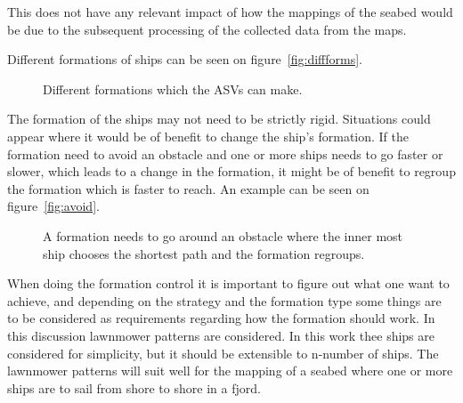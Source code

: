 
This does not have any relevant impact of how the mappings of the seabed would be due to the subsequent processing of the collected data from the maps.

Different formations of ships can be seen on figure~\vref{fig:diffforms}.
\begin{figure}[htbp]
	\centering
	
	\caption{Different formations which the \ac{ASV}s can make.}
	\label{fig:diffforms}
\end{figure}

The formation of the ships may not need to be strictly rigid. Situations could appear where it would be of benefit to change the ship's formation. If the formation need to avoid an obstacle and one or more ships needs to go faster or slower, which leads to a change in the formation, it might be of benefit to regroup the formation which is faster to reach. An example can be seen on figure~\vref{fig:avoid}.

\begin{figure}[htbp]
	\centering
	
	\caption{A formation needs to go around an obstacle where the inner most ship chooses the shortest path and the formation regroups.}
	\label{fig:avoid}
\end{figure}

When doing the formation control it is important to figure out what one
want to achieve, and depending on the strategy and the formation type
some things are to be considered as requirements regarding how the
formation should work. In this discussion lawnmower patterns are considered. In this work thee ships are considered for simplicity, but it should be extensible to n-number of ships. The lawnmower patterns will suit well for the mapping of a seabed where one or more ships are to sail from shore to shore in a fjord.

